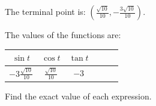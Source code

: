 \documentclass[fleqn,addpoints]{exam}
\begin{document}
\begin{questions}
\begin{solution}
        The terminal point is: $\left( \frac{\sqrt{10}}{10}, -\frac{3 \sqrt{10}}{10} \right)$.

        The values of the functions are:

        \begin{center}
          \begin{tabular}[H]{cccccc}
            \toprule
            $\sin t$                  & $\cos t$               & $\tan t$ \\
            \midrule
            $-3 \frac{\sqrt{10}}{10}$ & $\frac{\sqrt{10}}{10}$ & $-3$     \\
            \bottomrule
          \end{tabular}
        \end{center}

      \end{solution}

    \question Find the exact value of each expression.
\end{questions}
\end{document}

